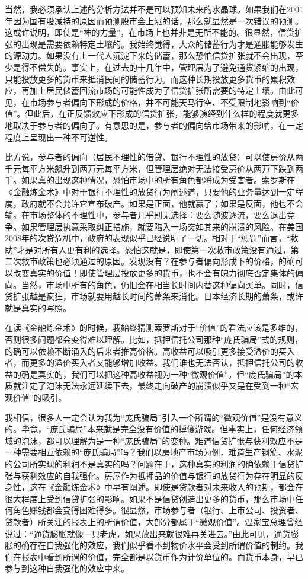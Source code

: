 当然，我必须承认上述的分析方法并不是可以预知未来的水晶球。如果我们在2001年因为国有股减持的原因而预测股市会上涨的话，那么就显然是一次错误的预测。这或许说明，即使是“神的力量”，在市场上也并非是无所不能的。很显然，信贷扩张的出现是需要依赖特定土壤的。我始终觉得，大众的储蓄行为才是通胀能够发生的源动力。如果没有上一代人沉淀下来的储蓄，那么恐怕信贷扩张就不会出现，至少是得不偿失的。事实上，在过去的十几年中，管理层为了避免通货紧缩的出现，只能投放更多的货币来抵消民间的储蓄行为。而这种长期投放更多货币的累积效应，再加上居民储蓄回流市场的可能性成为了信贷扩张所需要的特定土壤。由此可见，在市场参与者偏向下形成的价格，并不可能天马行空、不受限制地影响到“价值”。但此后，在正反馈效应下形成的信贷扩张，能够演绎到什么样的程度就更多地取决于参与者的偏向了。有意思的是，参与者的偏向给市场带来的影响，在一定程度上呈现出一种不可逆性。

比方说，参与者的偏向（居民不理性的借贷、银行不理性的放贷）可以使房价从两千元每平方米飙升到两万元每平方米，但管理层绝对无法接受房价从两万下跌到两千。如果真的出现这种情况，恐怕市场中的所有角色都将成为受害者。索罗斯在《金融炼金术》中对于银行不理性的放贷行为阐述道，只要他的业务量达到一定程度，政府就不会允许它宣布破产。如果是正面，他就赢了；如果是反面，他也不会输。在市场整体的不理性中，参与者几乎别无选择：要么随波逐流，要么退出竞争。如果管理层执意采取纠正措施，就要陷入一场突如其来的崩溃的风险。在美国2008年的次贷危机中，政府的表现似乎已经说明了一切。相对于“惩罚”而言，“救助”才是对所有人更有利的选择。恐怕这就是，即使第一次救市政策没有通过，第二次救市政策也必须通过的原因。发现没有？在参与者偏向形成下的价格，的确可以改变真实的价值！即使管理层投放更多的货币，也不会有魄力彻底否定集体的偏向。当然，市场中所有的角色，仍旧会在相当长时间内替这种偏向买单。同时，信贷扩张越是疯狂，市场就要用越长时间的萧条来消化。日本经济长期的萧条，或许就是真实的写照。

在读《金融炼金术》的时候，我始终猜测索罗斯对于“价值”的看法应该是多维的，否则很多问题都会变得难以理解。比如，抵押信托公司那种“庞氏骗局”式的规则，的确可以依赖不断涌入的后来者推高价格。高收益可以吸引更多接受溢价的买入者，而更多的溢价买入者又能够增加收益。我们谁也无法否认，抵押信托公司的收益的确是真实的，我们可以把这种高收益视为一种“微观价值”。但“庞氏骗局”的本质就注定了泡沫无法永远延续下去，最终走向破产的崩溃似乎又是在受到一种“宏观价值”的吸引。

我相信，很多人一定会认为我为“庞氏骗局”引入一个所谓的“微观价值”是没有意义的。毕竟，“庞氏骗局”本来就是完全没有价值的搏傻游戏。但事实上，任何经济领域的泡沫，都可以理解为是一种“庞氏骗局”的变种。难道信贷扩张与获利效应不是一种需要相互依赖的“庞氏骗局”吗？我们以房地产市场为例，难道生产钢筋、水泥的公司所实现的利润不是真实的吗？问题在于，这种真实的利润的确依赖于信贷扩张与获利效应的自我强化。房屋作为抵押品的价值与银行的放贷行为存在明显的反身性，这在《金融炼金术》中早有阐述。即使是贷款者对未来收入的预期，都会在很大程度上受到信贷扩张的影响。如果不是信贷创造出更多的货币，那么市场中任何角色赚钱都会变得困难得多。很显然，市场参与者（银行、上市公司、投资者、贷款者）所关注的报表上的所谓价值，大部分都属于“微观价值”。温家宝总理曾经说过：“通货膨胀就像一只老虎，如果放出来就很难再关进去。”由此可见，通货膨胀的确存在自我强化的效应，我们似乎看不到物价水平会受到所谓价值的制约。我们在报表中看到所谓的价值，完全都是以货币作为计价单位的。而货币本身，早已参与到这种自我强化的效应中来。

